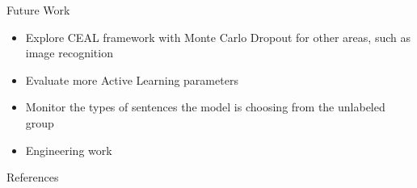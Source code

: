 \documentclass[10pt]{beamer}
\begin{document}
\begin{frame}[fragile]{Future Work}
\begin{itemize}
\item Explore CEAL framework with Monte Carlo Dropout for other areas, such as image recognition
\item Evaluate more Active Learning parameters
\item Monitor the types of sentences the model is choosing from the unlabeled group
\item \alert{Engineering work}
\end{itemize}
\end{frame}

\begin{frame}[fragile]{References}
  
  
\end{frame}
\end{document}
